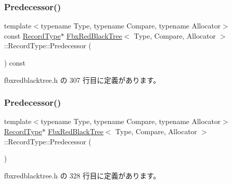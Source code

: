 \subsubsection{\texorpdfstring{Predecessor()}{Predecessor()}\hspace{0.1cm}{\footnotesize\ttfamily [1/2]}}
{\footnotesize\ttfamily template$<$typename Type, typename Compare, typename Allocator$>$ \\
const \hyperlink{class_fbx_red_black_tree_1_1_record_type}{Record\+Type}$\ast$ \hyperlink{class_fbx_red_black_tree}{Fbx\+Red\+Black\+Tree}$<$ Type, Compare, Allocator $>$\+::Record\+Type\+::\+Predecessor (\begin{DoxyParamCaption}{ }\end{DoxyParamCaption}) const\hspace{0.3cm}{\ttfamily [inline]}}



 fbxredblacktree.\+h の 307 行目に定義があります。

\mbox{\label{class_fbx_red_black_tree_1_1_record_type_a425843b67a7fb4cc732427f058b76860}} 
\subsubsection{\texorpdfstring{Predecessor()}{Predecessor()}\hspace{0.1cm}{\footnotesize\ttfamily [2/2]}}
{\footnotesize\ttfamily template$<$typename Type, typename Compare, typename Allocator$>$ \\
\hyperlink{class_fbx_red_black_tree_1_1_record_type}{Record\+Type}$\ast$ \hyperlink{class_fbx_red_black_tree}{Fbx\+Red\+Black\+Tree}$<$ Type, Compare, Allocator $>$\+::Record\+Type\+::\+Predecessor (\begin{DoxyParamCaption}{ }\end{DoxyParamCaption})\hspace{0.3cm}{\ttfamily [inline]}}



 fbxredblacktree.\+h の 328 行目に定義があります。

\mbox{\label{class_fbx_red_black_tree_1_1_record_type_add6f12144b2e60f2d209d160a4c4f1aa}} 
